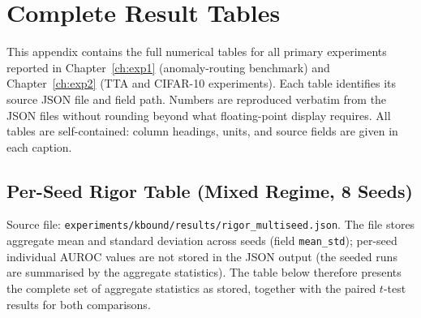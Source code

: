 \chapter{Complete Result Tables}\label{app:tables}

This appendix contains the full numerical tables for all primary experiments reported in
Chapter~\ref{ch:exp1} (anomaly-routing benchmark) and Chapter~\ref{ch:exp2} (TTA and
CIFAR-10 experiments).  Each table identifies its source JSON file and field path.
Numbers are reproduced verbatim from the JSON files without rounding beyond what floating-point
display requires.  All tables are self-contained: column headings, units, and source fields
are given in each caption.

\section{Per-Seed Rigor Table (Mixed Regime, 8 Seeds)}
\label{sec:app-rigor}

Source file: \texttt{experiments/kbound/results/rigor\_multiseed.json}.
The file stores aggregate mean and standard deviation across seeds (field
\texttt{mean\_std}); per-seed individual AUROC values are not stored in the JSON output
(the seeded runs are summarised by the aggregate statistics).  The table below therefore
presents the complete set of aggregate statistics as stored, together with the paired
$t$-test results for both comparisons.

